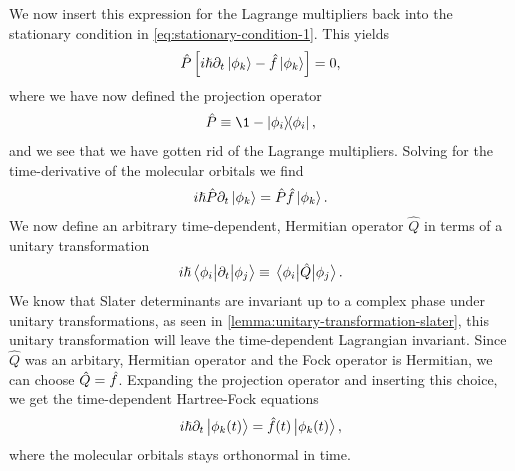     We now insert this expression for the Lagrange multipliers back into the
    stationary condition in \autoref{eq:stationary-condition-1}.
    This yields
    \begin{align}
        \hat{P}\left[ 
            i\hslash\partial_t\ket{\phi_k}
            - \hat{f}\ket{\phi_k}
         \right]
        = 0,
    \end{align}
    where we have now defined the projection operator
    \begin{align}
        \hat{P} \equiv \1 - \dyad{\phi_i}{\phi_i},
    \end{align}
    and we see that we have gotten rid of the Lagrange multipliers.
    Solving for the time-derivative of the molecular orbitals we find
    \begin{align}
        i\hslash\hat{P}\partial_t\ket{\phi_k}
        = \hat{P}\hat{f}\ket{\phi_k}.
    \end{align}
    We now define an arbitrary time-dependent, Hermitian operator $\hat{Q}$
    in terms of a unitary transformation \cite{hochstuhl2014time}
    \begin{align}
        i\hslash\mel{\phi_i}{\partial_t}{\phi_j}
        \equiv
        \mel{\phi_i}{\hat{Q}}{\phi_j}.
    \end{align}
    We know that  Slater determinants are invariant up to a complex phase under
    unitary transformations, as seen in
    \autoref{lemma:unitary-transformation-slater}, this unitary transformation
    will leave the time-dependent Lagrangian invariant.
    Since $\hat{Q}$ was an arbitary, Hermitian operator and the Fock operator is
    Hermitian, we can choose $\hat{Q} = \hat{f}$.
    Expanding the projection operator and inserting this choice, we get the
    time-dependent Hartree-Fock equations
    \begin{align}
        i\hslash\partial_t\ket{\phi_k(t)}
        = \hat{f}(t)\ket{\phi_k(t)},
        \label{eq:tdhf}
    \end{align}
    where the molecular orbitals stays orthonormal in time.
